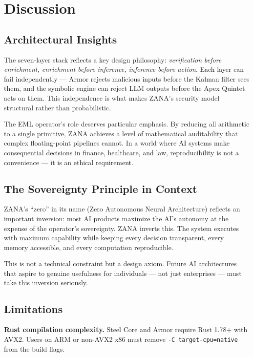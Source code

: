 \documentclass[12pt,a4paper]{article}
\begin{document}
\section{Discussion}

\subsection{Architectural Insights}

The seven-layer stack reflects a key design philosophy: \emph{verification before enrichment,
enrichment before inference, inference before action}. Each layer can fail independently ---
Armor rejects malicious inputs before the Kalman filter sees them, and the symbolic engine
can reject LLM outputs before the Apex Quintet acts on them. This independence is what makes
ZANA's security model structural rather than probabilistic.

The EML operator's role deserves particular emphasis. By reducing all arithmetic to a single
primitive, ZANA achieves a level of mathematical auditability that complex floating-point
pipelines cannot. In a world where AI systems make consequential decisions in finance,
healthcare, and law, reproducibility is not a convenience --- it is an ethical requirement.

\subsection{The Sovereignty Principle in Context}

ZANA's ``zero'' in its name (Zero Autonomous Neural Architecture) reflects an important
inversion: most AI products maximize the AI's autonomy at the expense of the operator's
sovereignty. ZANA inverts this. The system executes with maximum capability while keeping
every decision transparent, every memory accessible, and every computation reproducible.

This is not a technical constraint but a design axiom. Future AI architectures that aspire
to genuine usefulness for individuals --- not just enterprises --- must take this inversion
seriously.

\subsection{Limitations}

\textbf{Rust compilation complexity.} Steel Core and Armor require Rust 1.78+ with AVX2.
Users on ARM or non-AVX2 x86 must remove \texttt{-C target-cpu=native} from the build flags.
\end{document}
